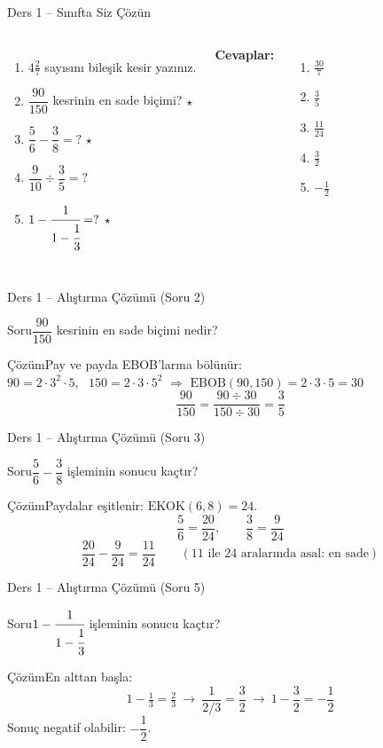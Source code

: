 \documentclass[aspectratio=169,11pt]{beamer}
\newcommand{\soru}[3]{%
\begin{frame}{#1}
  \begin{block}{Soru}\large #2\end{block}
  \pause
  \begin{exampleblock}{Çözüm}\large #3\end{exampleblock}
\end{frame}}
\begin{document}
\begin{frame}{Ders 1 -- Sınıfta Siz Çözün}
\begin{columns}[t]
\begin{enumerate}
\item \(4\frac{2}{7}\) sayısını bileşik kesir yazınız.
\item \(\dfrac{90}{150}\) kesrinin en sade biçimi? \(\star\)
\item \(\dfrac{5}{6}-\dfrac{3}{8}=?\) \(\star\)
\item \(\dfrac{9}{10}\div\dfrac{3}{5}=?\)
\item \(1-\cfrac{1}{1-\cfrac{1}{3}}=?\) \(\star\)
\end{enumerate}
\pause
\textbf{Cevaplar:}
\begin{enumerate}
\item \(\frac{30}{7}\)
\item \(\frac{3}{5}\)
\item \(\frac{11}{24}\)
\item \(\frac{3}{2}\)
\item \(-\frac{1}{2}\)
\end{enumerate}
\end{columns}
\vspace{4pt}{\footnotesize \(\star\) işaretli soruların adım adım çözümü sonraki slaytlardadır.}
\end{frame}

\soru{Ders 1 -- Alıştırma Çözümü (Soru 2)}
{\(\dfrac{90}{150}\) kesrinin en sade biçimi nedir?}
{Pay ve payda EBOB'larına bölünür:\\[3pt]
\(90=2\cdot 3^2\cdot 5\), \ \(150=2\cdot 3\cdot 5^2\) \(\Rightarrow\) \(\text{EBOB}(90,150)=2\cdot 3\cdot 5=30\)
\[\frac{90}{150}=\frac{90\div 30}{150\div 30}=\frac{3}{5}\]}

\soru{Ders 1 -- Alıştırma Çözümü (Soru 3)}
{\(\dfrac{5}{6}-\dfrac{3}{8}\) işleminin sonucu kaçtır?}
{Paydalar eşitlenir: \(\text{EKOK}(6,8)=24\).
\[\frac{5}{6}=\frac{20}{24},\qquad \frac{3}{8}=\frac{9}{24}\]
\[\frac{20}{24}-\frac{9}{24}=\frac{11}{24}\qquad(\text{\(11\) ile \(24\) aralarında asal: en sade})\]}

\soru{Ders 1 -- Alıştırma Çözümü (Soru 5)}
{\(1-\cfrac{1}{1-\cfrac{1}{3}}\) işleminin sonucu kaçtır?}
{En alttan başla:
\[1-\tfrac{1}{3}=\tfrac{2}{3}\ \rightarrow\ \frac{1}{2/3}=\frac{3}{2}\ \rightarrow\ 1-\frac{3}{2}=-\frac{1}{2}\]
Sonuç negatif olabilir: \(-\dfrac{1}{2}\).}
\end{document}

